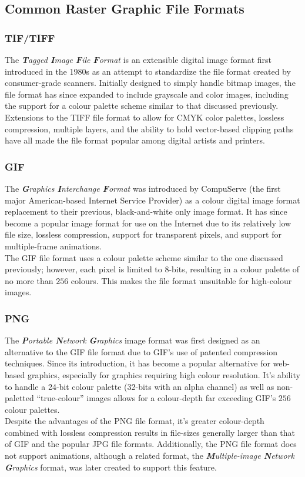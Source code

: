     \subsection{Common Raster Graphic File Formats}
      \subsubsection{TIF/TIFF}
        The \emph{\textbf{T}agged \textbf{I}mage \textbf{F}ile \textbf{F}ormat} is an extensible digital image format first introduced in the 1980s as an attempt to standardize the file format created by consumer-grade scanners. Initially designed to simply handle bitmap images, the file format has since expanded to include grayscale and color images, including the support for a colour palette scheme similar to that discussed previously.\\[\baselineskip]
        Extensions to the TIFF file format to allow for CMYK color palettes, lossless compression, multiple layers, and the ability to hold vector-based clipping paths have all made the file format popular among digital artists and printers. 
      \subsubsection{GIF}
        The \emph{\textbf{G}raphics \textbf{I}nterchange \textbf{F}ormat} was introduced by CompuServe (the first major American-based Internet Service Provider) as a colour digital image format replacement to their previous, black-and-white only image format. It has since become a popular image format for use on the Internet due to its relatively low file size, lossless compression, support for transparent pixels, and support for multiple-frame animations.\\[\baselineskip]
        The GIF file format uses a colour palette scheme similar to the one discussed previously; however, each pixel is limited to 8-bits, resulting in a colour palette of no more than $256$ colours. This makes the file format unsuitable for high-colour images.
      \subsubsection{PNG}
        The \emph{\textbf{P}ortable \textbf{N}etwork \textbf{G}raphics} image format was first designed as an alternative to the GIF file format due to GIF's use of patented compression techniques. Since its introduction, it has become a popular alternative for web-based graphics, especially for graphics requiring high colour resolution. It's ability to handle a 24-bit colour palette (32-bits with an alpha channel) as well as non-paletted ``true-colour'' images allows for a colour-depth far exceeding GIF's $256$ colour palettes.\\[\baselineskip]
        Despite the advantages of the PNG file format, it's greater colour-depth combined with lossless compression results in file-sizes generally larger than that of GIF and the popular JPG file formats. Additionally, the PNG file format does not support animations, although a related format, the \emph{\textbf{M}ultiple-image \textbf{N}etwork \textbf{G}raphics} format, was later created to support this feature.
